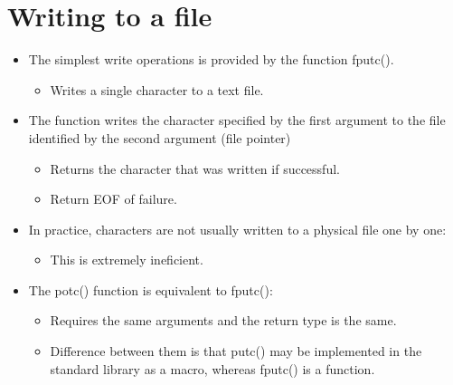 \section{Writing to a file}
\begin{itemize}
    \item The simplest write operations is provided by the function fputc().
        \begin{itemize}
            \item Writes a single character to a text file.
        \end{itemize}
    
    \item The function writes the character specified by the first argument to the file identified by the second argument (file pointer)
        \begin{itemize}
            \item Returns the character that was written if successful.
            \item Return EOF of failure.
        \end{itemize}
    
    \item In practice, characters are not usually written to a physical file one by one:
        \begin{itemize}
            \item This is extremely ineficient.
        \end{itemize}
    
    \item The potc() function is equivalent to fputc():
        \begin{itemize}
            \item Requires the same arguments and the return type is the same.
            \item Difference between them is that putc() may be implemented in the standard library as a macro, whereas fputc() is a function.
        \end{itemize}
\end{itemize}

